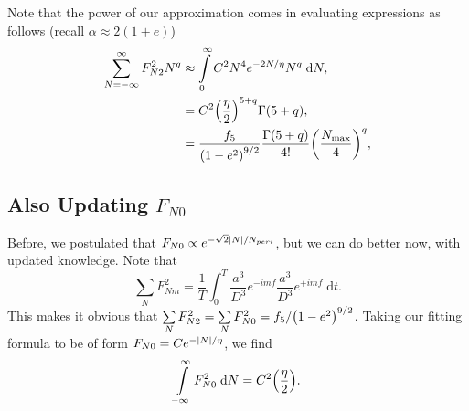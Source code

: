 \documentclass[11pt,
        usenames, %
        dvipsnames %
    ]{article}
\DeclarePairedDelimiter\abs{\lvert}{\rvert}
\DeclarePairedDelimiter\p{\lparen}{\rparen}
\begin{document}

Note that the power of our approximation comes in evaluating expressions as
follows (recall $\alpha \approx 2 (1 + e)$)
\begin{align}
    \sum\limits_{N = -\infty}^\infty F_{N2}^2 N^q
        &\approx \int\limits_0^\infty C^2 N^4 e^{-2 N / \eta}N^q
            \;\mathrm{d}N,\\
        &= C^2 \p*{\frac{\eta}{2}}^{5 + q}\Gamma\p*{5 + q},\\
        &= \frac{f_5}{\p*{1 - e^2}^{9/2}}
            \frac{\Gamma\p*{5 + q}}{4!}\p*{\frac{N_{\max}}{4}}^q,
            \label{eq:fn2_swiss_army_knife}
\end{align}

\subsection{Also Updating $F_{N0}$}

Before, we postulated that $F_{N0} \propto e^{-\sqrt{2}\abs*{N} / N_{peri}}$,
but we can do better now, with updated knowledge. Note that
\begin{equation}
    \sum\limits_N F_{Nm}^2 = \frac{1}{T}\int_0^T
        \frac{a^3}{D^3}e^{-imf}\frac{a^3}{D^3} e^{+imf}\;\mathrm{d}t.
\end{equation}
This makes it obvious that $\sum\limits_N F_{N2}^2 = \sum\limits_N F_{N0}^2 =
f_5 / \p*{1 - e^2}^{9/2}$. Taking our fitting formula to be of form $F_{N0} =
Ce^{-\abs*{N} / \eta}$, we find
\begin{equation}
    \int\limits_{-\infty}^\infty F_{N0}^2\;\mathrm{d}N
        = C^2\p*{\frac{\eta}{2}}.
\end{equation}
\end{document}
